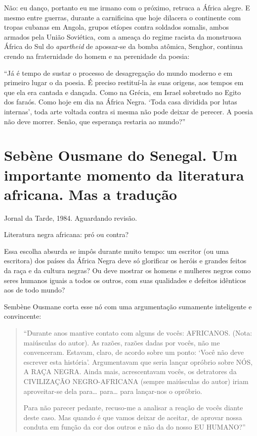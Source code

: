 \documentclass[
  letterpaper,
  DIV=11,
  numbers=noendperiod]{scrreprt}
\begin{document}
Não: eu danço, portanto eu me irmano com o próximo, retruca a África
alegre. E mesmo entre guerras, durante a carnificina que hoje dilacera o
continente com tropas cubanas em Angola, grupos etíopes contra soldados
somalis, ambos armados pela União Soviética, com a ameaça do regime
racista da monstruosa África do Sul do \emph{apartheid} de apossar-se da
bomba atômica, Senghor, continua crendo na fraternidade do homem e na
perenidade da poesia:

``Já é tempo de sustar o processo de desagregação do mundo moderno e em
primeiro lugar o da poesia. É preciso restituí-la às suas origens, aos
tempos em que ela era cantada e dançada. Como na Grécia, em Israel
sobretudo no Egito dos faraós. Como hoje em dia na África Negra. `Toda
casa dividida por lutas internas', toda arte voltada contra si mesma não
pode deixar de perecer. A poesia não deve morrer. Senão, que esperança
restaria ao mundo?''

\chapter{Sebène Ousmane do Senegal. Um importante momento da literatura
africana. Mas a
tradução}\label{sebuxe8ne-ousmane-do-senegal.-um-importante-momento-da-literatura-africana.-mas-a-traduuxe7uxe3o}

Jornal da Tarde, 1984. Aguardando revisão.

\hfill\break

Literatura negra africana: pró ou contra?

Essa escolha absurda se impôs durante muito tempo: um escritor (ou uma
escritora) dos países da África Negra deve só glorificar os heróis e
grandes feitos da raça e da cultura negras? Ou deve mostrar os homens e
mulheres negros como seres humanos iguais a todos os outros, com suas
qualidades e defeitos idênticos aos de todo mundo?

Sembène Ousmane corta esse nó com uma argumentação sumamente inteligente
e convincente:

\begin{quote}
``Durante anos mantive contato com alguns de vocês: AFRICANOS. (Nota:
maiúsculas do autor). As razões, razões dadas por vocês, não me
convenceram. Estavam, claro, de acordo sobre um ponto: `Você não deve
escrever esta história'. Argumentavam que seria lançar opróbrio sobre
NÓS, A RAÇA NEGRA. Ainda mais, acrescentavam vocês, os detratores da
CIVILIZAÇÃO NEGRO-AFRICANA (sempre maiúsculas do autor) iriam
aproveitar-se dela para\ldots{} para\ldots{} para lançar-nos o opróbrio.

Para não parecer pedante, recuso-me a analisar a reação de vocês diante
deste caso. Mas quando é que vamos deixar de aceitar, de aprovar nossa
conduta em função da cor dos outros e não da do nosso EU HUMANO?''
\end{quote}
\end{document}
